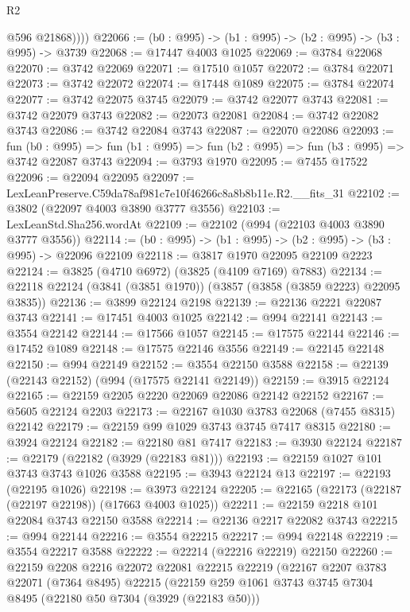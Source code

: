 \begin{lexlean}{R2}
\begin{coremodule}
            @596
            @21868))))
@22066 := (b0 : @995) -> (b1 : @995) -> (b2 : @995) -> (b3 : @995) -> @3739
@22068 := @17447 @4003 @1025
@22069 := @3784 @22068
@22070 := @3742 @22069
@22071 := @17510 @1057
@22072 := @3784 @22071
@22073 := @3742 @22072
@22074 := @17448 @1089
@22075 := @3784 @22074
@22077 := @3742 @22075 @3745
@22079 := @3742 @22077 @3743
@22081 := @3742 @22079 @3743
@22082 := @22073 @22081
@22084 := @3742 @22082 @3743
@22086 := @3742 @22084 @3743
@22087 := @22070 @22086
@22093 := fun (b0 : @995) =>
  fun (b1 : @995) => fun (b2 : @995) => fun (b3 : @995) => @3742 @22087 @3743
@22094 := @3793 @1970
@22095 := @7455 @17522
@22096 := @22094 @22095
@22097 := LexLeanPreserve.C59da78af981c7e10f46266c8a8b8b11e.R2.__fits_31
@22102 := @3802 (@22097 @4003 @3890 @3777 @3556)
@22103 := LexLeanStd.Sha256.wordAt
@22109 := @22102 (@994 (@22103 @4003 @3890 @3777 @3556))
@22114 := (b0 : @995) -> (b1 : @995) -> (b2 : @995) -> (b3 : @995) -> @22096 @22109
@22118 := @3817 @1970 @22095 @22109 @2223
@22124 := @3825 (@4710 @6972) (@3825 (@4109 @7169) @7883)
@22134 := @22118 @22124 (@3841 (@3851 @1970)) (@3857 (@3858 (@3859 @2223) @22095 @3835))
@22136 := @3899 @22124 @2198
@22139 := @22136 @2221 @22087 @3743
@22141 := @17451 @4003 @1025
@22142 := @994 @22141
@22143 := @3554 @22142
@22144 := @17566 @1057
@22145 := @17575 @22144
@22146 := @17452 @1089
@22148 := @17575 @22146 @3556
@22149 := @22145 @22148
@22150 := @994 @22149
@22152 := @3554 @22150 @3588
@22158 := @22139 (@22143 @22152) (@994 (@17575 @22141 @22149))
@22159 := @3915 @22124
@22165 := @22159 @2205 @2220 @22069 @22086 @22142 @22152
@22167 := @5605 @22124 @2203
@22173 := @22167 @1030 @3783 @22068 (@7455 @8315) @22142
@22179 := @22159 @99 @1029 @3743 @3745 @7417 @8315
@22180 := @3924 @22124
@22182 := @22180 @81 @7417
@22183 := @3930 @22124
@22187 := @22179 (@22182 (@3929 (@22183 @81)))
@22193 := @22159 @1027 @101 @3743 @3743 @1026 @3588
@22195 := @3943 @22124 @13
@22197 := @22193 (@22195 @1026)
@22198 := @3973 @22124
@22205 := @22165 (@22173 (@22187 (@22197 @22198)) (@17663 @4003 @1025))
@22211 := @22159 @2218 @101 @22084 @3743 @22150 @3588
@22214 := @22136 @2217 @22082 @3743
@22215 := @994 @22144
@22216 := @3554 @22215
@22217 := @994 @22148
@22219 := @3554 @22217 @3588
@22222 := @22214 (@22216 @22219) @22150
@22260 := @22159
    @2208
    @2216
    @22072
    @22081
    @22215
    @22219
    (@22167
      @2207
      @3783
      @22071
      (@7364 @8495)
      @22215
      (@22159
        @259
        @1061
        @3743
        @3745
        @7304
        @8495
        (@22180 @50 @7304 (@3929 (@22183 @50)))

\end{coremodule}
\end{lexlean}

